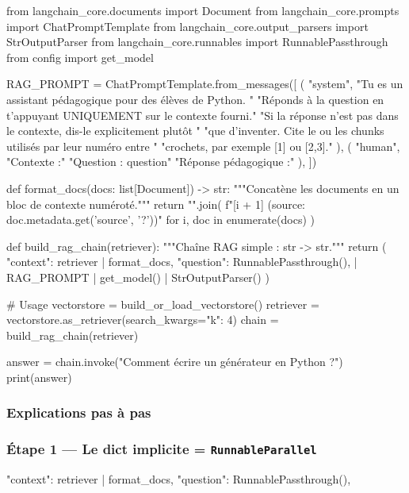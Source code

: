 \documentclass[11pt,a4paper]{article}
\begin{document}
\begin{pythoncode}
from langchain_core.documents import Document
from langchain_core.prompts import ChatPromptTemplate
from langchain_core.output_parsers import StrOutputParser
from langchain_core.runnables import RunnablePassthrough
from config import get_model


RAG_PROMPT = ChatPromptTemplate.from_messages([
    (
        "system",
        "Tu es un assistant pédagogique pour des élèves de Python. "
        "Réponds à la question en t'appuyant UNIQUEMENT sur le contexte fourni.\n"
        "Si la réponse n'est pas dans le contexte, dis-le explicitement plutôt "
        "que d'inventer. Cite le ou les chunks utilisés par leur numéro entre "
        "crochets, par exemple [1] ou [2,3]."
    ),
    (
        "human",
        "Contexte :\n\n"
        "Question : {question}\n\n"
        "Réponse pédagogique :"
    ),
])


def format_docs(docs: list[Document]) -> str:
    """Concatène les documents en un bloc de contexte numéroté."""
    return "\n\n".join(
        f"[{i + 1}] (source: {doc.metadata.get('source', '?')})"
        for i, doc in enumerate(docs)
    )


def build_rag_chain(retriever):
    """Chaîne RAG simple : str -> str."""
    return (
        {
            "context":  retriever | format_docs,
            "question": RunnablePassthrough(),
        }
        | RAG_PROMPT
        | get_model()
        | StrOutputParser()
    )


# Usage
vectorstore = build_or_load_vectorstore()
retriever   = vectorstore.as_retriever(search_kwargs={"k": 4})
chain       = build_rag_chain(retriever)

answer = chain.invoke("Comment écrire un générateur en Python ?")
print(answer)
\end{pythoncode}

\subsubsection{Explications pas à pas}

\subsubsection*{Étape 1 — Le dict implicite = \texttt{RunnableParallel}}

\begin{pythoncode}
{
    "context":  retriever | format_docs,
    "question": RunnablePassthrough(),
}
\end{pythoncode}
\end{document}
